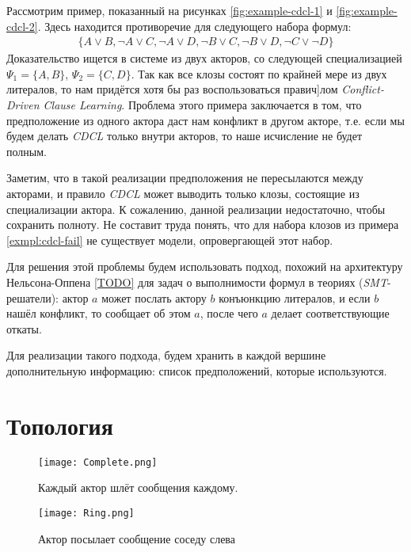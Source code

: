 \begin{example}
\label{exmpl:cdcl-fail}
Рассмотрим пример, показанный на рисунках \ref{fig:example-cdcl-1} и \ref{fig:example-cdcl-2}. Здесь находится противоречие для следующего набора формул: \begin{gather*}
			\{ A \vee B
             , \neg A \vee C
             , \neg A \vee D
             , \neg B \vee C
             , \neg B \vee D
             , \neg C \vee \neg D
            \}
		\end{gather*}
 Доказательство ищется в системе из двух акторов, со следующей специализацией $\Psi_1 = \{A, B\}$, $\Psi_2 = \{C, D\}$. Так как все клозы состоят по крайней мере из двух литералов, то нам придётся хотя бы раз воспользоваться правич]лом \emph{Conflict-Driven Clause Learning}. Проблема этого примера заключается в том, что предположение из одного актора даст нам конфликт в другом акторе, т.е. если мы будем делать \emph{CDCL} только внутри акторов, то наше исчисление не будет полным.
\end{example}

Заметим, что в такой реализации предположения не пересылаются между акторами, и правило \emph{CDCL} может выводить только клозы, состоящие из специализации актора. К сожалению, данной реализации недостаточно, чтобы сохранить полноту. Не составит труда понять, что для набора клозов из примера \ref{exmpl:cdcl-fail} не существует модели, опровергающей этот набор. 

Для решения этой проблемы будем использовать подход, похожий на архитектуру Нельсона-Оппена \ref{TODO} для задач о выполнимости формул в теориях (\emph{SMT}-решатели): актор $a$ может послать актору $b$ конъюнкцию литералов, и если $b$ нашёл конфликт, то сообщает об этом $a$, после чего $a$ делает соответствующие откаты.

Для реализации такого подхода, будем хранить в каждой вершине дополнительную информацию: список предположений, которые используются.

\section{Топология}
\begin{figure}[!h]
\centering
\texttt{[image: Complete.png]}
\caption{Каждый актор шлёт сообщения каждому.}\label{fig:complete}
\end{figure}

\begin{figure}[!h]
\centering
\texttt{[image: Ring.png]}
\caption{Актор посылает сообщение соседу слева}\label{fig:ring}
\end{figure}

